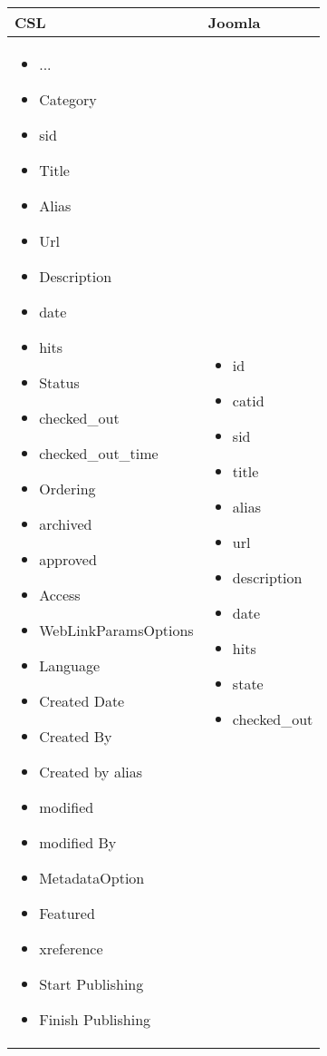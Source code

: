 \begin{minipage}{0.7\textwidth}
\begin{tabular}{|p{} | p{}|}
\hline
\textbf{CSL} & \textbf{Joomla} \\ 
\hline
\begin{itemize}
\item ...
\item   Category
\item   sid
\item   Title
\item   Alias
\item   Url
\item   Description
\item   date
\item   hits
\item   Status
\item   checked\_out
\item   checked\_out\_time
\item   Ordering
\item   archived
\item   approved
\item   Access
\item   WebLinkParamsOptions
\item   Language
\item   Created Date
\item   Created By
\item   Created by alias
\item   modified
\item   modified By
\item   MetadataOption
\item   Featured
\item   xreference
\item   Start Publishing
\item   Finish Publishing
\end{itemize}
 & 
\begin{itemize}
\item id
\item   catid
\item   sid
\item   title
\item   alias
\item   url
\item   description
\item   date
\item   hits
\item   state
\item   checked\_out

\end{itemize}
\end{tabular}
\end{minipage}
